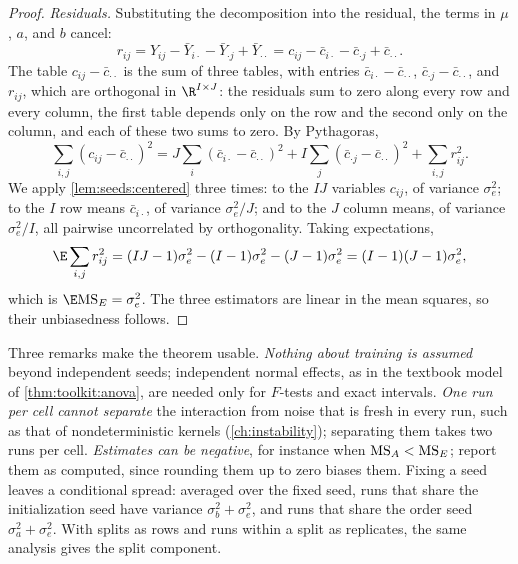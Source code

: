 \begin{refsection}
\begin{proof}
\emph{Residuals.} Substituting the decomposition into the residual, the terms in $\mu$, $a$, and $b$ cancel:
\[
r_{ij}=Y_{ij}-\bar Y_{i\cdot}-\bar Y_{\cdot j}+\bar Y_{\cdot\cdot}=c_{ij}-\bar c_{i\cdot}-\bar c_{\cdot j}+\bar c_{\cdot\cdot}.
\]
The table $c_{ij}-\bar c_{\cdot\cdot}$ is the sum of three tables, with entries $\bar c_{i\cdot}-\bar c_{\cdot\cdot}$, $\bar c_{\cdot j}-\bar c_{\cdot\cdot}$, and $r_{ij}$, which are orthogonal in $\R^{I\times J}$: the residuals sum to zero along every row and every column, the first table depends only on the row and the second only on the column, and each of these two sums to zero. By Pythagoras,
\[
\sum_{i,j}(c_{ij}-\bar c_{\cdot\cdot})^2=J\sum_i(\bar c_{i\cdot}-\bar c_{\cdot\cdot})^2+I\sum_j(\bar c_{\cdot j}-\bar c_{\cdot\cdot})^2+\sum_{i,j}r_{ij}^2 .
\]
We apply \cref{lem:seeds:centered} three times: to the $IJ$ variables $c_{ij}$, of variance $\sigma_e^2$; to the $I$ row means $\bar c_{i\cdot}$, of variance $\sigma_e^2/J$; and to the $J$ column means, of variance $\sigma_e^2/I$, all pairwise uncorrelated by orthogonality. Taking expectations,
\[
\E\sum_{i,j}r_{ij}^2=(IJ-1)\sigma_e^2-(I-1)\sigma_e^2-(J-1)\sigma_e^2=(I-1)(J-1)\sigma_e^2,
\]
which is $\E\seedsMS E=\sigma_e^2$. The three estimators are linear in the mean squares, so their unbiasedness follows.
\end{proof}

Three remarks make the theorem usable. \emph{Nothing about training is assumed} beyond independent seeds; independent normal effects, as in the textbook model of \cref{thm:toolkit:anova}, are needed only for $F$-tests and exact intervals. \emph{One run per cell cannot separate} the interaction from noise that is fresh in every run, such as that of nondeterministic kernels (\cref{ch:instability}); separating them takes two runs per cell. \emph{Estimates can be negative}, for instance when $\mathrm{MS}_{A}<\mathrm{MS}_{E}$; report them as computed, since rounding them up to zero biases them. Fixing a seed leaves a conditional spread: averaged over the fixed seed, runs that share the initialization seed have variance $\sigma_b^2+\sigma_e^2$, and runs that share the order seed $\sigma_a^2+\sigma_e^2$. With splits as rows and runs within a split as replicates, the same analysis gives the split component.


\end{refsection}
